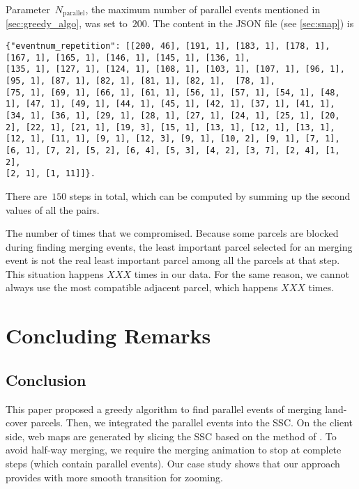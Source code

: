 \documentclass[ijgi,article,submit,moreauthors,pdftex]{Definitions/mdpi}
\begin{document}
Parameter~$N_\mathrm{parallel}$, 
the maximum number of parallel events mentioned in \sect\ref{sec:greedy_algo},
was set to~$200$.
The content in the JSON file (see \sect\ref{sec:snap}) is 
\makeatletter
\def\verbatim@font{\normalfont\rmfamily}
\makeatother
\begin{verbatim}
{"eventnum_repetition": [[200, 46], [191, 1], [183, 1], [178, 1], [167, 1], [165, 1], [146, 1], [145, 1], [136, 1], 
[135, 1], [127, 1], [124, 1], [108, 1], [103, 1], [107, 1], [96, 1], [95, 1], [87, 1], [82, 1], [81, 1], [82, 1],  [78, 1], 
[75, 1], [69, 1], [66, 1], [61, 1], [56, 1], [57, 1], [54, 1], [48, 1], [47, 1], [49, 1], [44, 1], [45, 1], [42, 1], [37, 1], [41, 1], 
[34, 1], [36, 1], [29, 1], [28, 1], [27, 1], [24, 1], [25, 1], [20, 2], [22, 1], [21, 1], [19, 3], [15, 1], [13, 1], [12, 1], [13, 1], 
[12, 1], [11, 1], [9, 1], [12, 3], [9, 1], [10, 2], [9, 1], [7, 1], [6, 1], [7, 2], [5, 2], [6, 4], [5, 3], [4, 2], [3, 7], [2, 4], [1, 2], 
[2, 1], [1, 11]]}.
\end{verbatim}
There are~$150$ steps in total, 
which can be computed by summing up the second values of all the pairs.



The number of times that we compromised.
Because some parcels are blocked during finding merging events, 
the least important parcel selected for an merging event 
is not the real least important parcel 
among all the parcels at that step. 
This situation happens $XXX$ times in our data.
For the same reason, 
we cannot always use the most compatible adjacent parcel,
which happens $XXX$ times.






\section{Concluding Remarks}
\label{sec:concluding_remarks}

\subsection{Conclusion}
This paper proposed a greedy algorithm to find parallel events of 
merging land-cover parcels.
Then, we integrated the parallel events into the SSC. 
On the client side, web maps are generated by slicing the SSC
based on the method of \citet{Meijers2020Web}.
To avoid half-way merging, we require the merging animation 
to stop at complete steps (which contain parallel events).
Our case study shows that 
our approach provides with more smooth transition for zooming.
\end{document}
